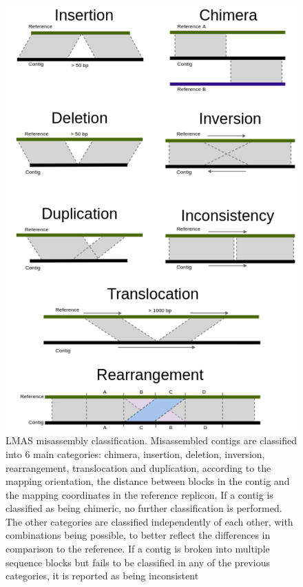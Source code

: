 \begin{figure}[h!]
\centering
\includegraphics[width=\textwidth]{figures/chapter 5/Supplemental Figure 1.png}
\caption{LMAS misassembly classification. Misassembled contigs are classified into 6 main categories: chimera, insertion, deletion, inversion, rearrangement, translocation and duplication, according to the mapping orientation, the distance between blocks in the contig and the mapping coordinates in the reference replicon. If a contig is classified as being chimeric, no further classification is performed. The other categories are classified independently of each other, with combinations being possible, to better reflect the differences in comparison to the reference. If a contig is broken into multiple sequence blocks but fails to be classified in any of the previous categories, it is reported as being inconsistent}
\label{fig:chap5_sup_figure_1}
\end{figure}

